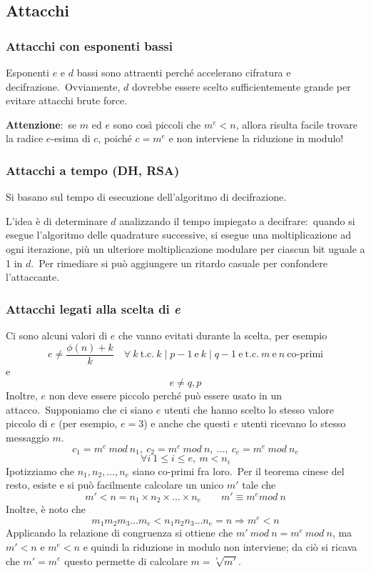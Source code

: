 \subsection{Attacchi}

\subsubsection{Attacchi con esponenti bassi}
Esponenti $e$ e $d$ bassi sono attraenti perché accelerano cifratura e decifrazione.\
Ovviamente, $d$ dovrebbe essere scelto sufficientemente grande per evitare attacchi brute force.\

\textbf{Attenzione}:\ se $m$ ed $e$ sono così piccoli che $m^e < n$, allora risulta facile trovare la radice $e$-esima di $c$, poiché $c = m^e$ e non interviene la riduzione in modulo!

\subsubsection{Attacchi a tempo (DH, RSA)}

Si basano sul tempo di esecuzione dell'algoritmo di decifrazione.\

L'idea è di determinare $d$ analizzando il tempo impiegato a decifrare:\ quando si esegue l'algoritmo delle quadrature successive, si esegue una moltiplicazione ad ogni iterazione, più un ulteriore moltiplicazione modulare per ciascun bit uguale a 1 in $d$.\
Per rimediare si può aggiungere un ritardo casuale per confondere l'attaccante.

\subsubsection{Attacchi legati alla scelta di \textit{e}}

Ci sono alcuni valori di $e$ che vanno evitati durante la scelta, per esempio
\[e \neq \frac{\phi(n) + k}{k}\quad\forall\ k\ \mathrm{t.c.}\ k \mid p - 1\ \mathrm{e}\ k \mid q - 1\ \mathrm{e\ t.c.}\ m\ \mathrm{e}\ n\ \mathrm{co\textrm{-}primi}\]
e
\[e \neq q,p\]
Inoltre, $e$ non deve essere piccolo perché può essere usato in un attacco.\
Supponiamo che ci siano $e$ utenti che hanno scelto lo stesso valore piccolo di $e$ (per esempio, $e= 3$) e anche che questi $e$ utenti ricevano lo stesso messaggio $m$.\
\[c_1 = m^e\ \mathit{mod}\ n_1,\ c_2 = m^e\ \mathit{mod}\ n,\ \dots,\ c_e = m^e\ \mathit{mod}\ n_e\] \[\forall i\ 1\leq i \leq e,\ m < n_i\]
Ipotizziamo che $n_1, n_2 , \dots, n_e$ siano co-primi fra loro.\
Per il teorema cinese del resto, esiste e si può facilmente calcolare un unico $m'$ tale che \[m' < n = n_1 \times n_2 \times \dots \times n_e \qquad m' \equiv m^e \mathit{mod}\ n\]
Inoltre, è noto che \[m_1 m_2 m_3 \dots m_e < n_1 n_2 n_3 \dots n_e = n \Rightarrow m^e < n\]
Applicando la relazione di congruenza si ottiene che $m'\ \mathit{mod}\ n = m^e\ \mathit{mod}\ n$, ma $m' < n$ e $m^e < n$ e quindi la riduzione in modulo non interviene; da ciò si ricava che $m' = m^e$ questo permette di calcolare $m = \sqrt[e]{m'}$.\

